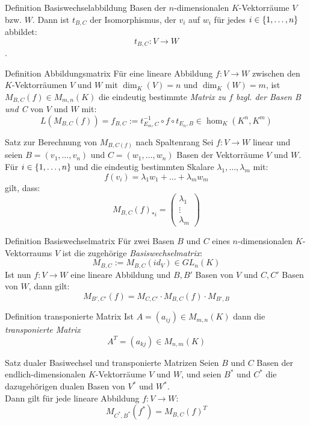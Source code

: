 \documentclass[main.tex]{subfiles}
\begin{document}
\begin{karte}{Definition Basiswechselabbildung}
    Basen der \(n\)-dimensionalen \(K\)-Vektorräume \(V\) bzw. \(W\).
    Dann ist \(t_{B,C}\) der Isomorphismus, der \(v_i\) auf \(w_i\) für 
    jedes \(i \in \{1, \ldots ,n\}\) abbildet: 
    \[ t_{B,C}: V \rightarrow W \].
\end{karte}
\begin{karte}{Definition Abbildungsmatrix}
    Für eine lineare Abbildung \(f:V \rightarrow W\) zwischen den
    \(K\)-Vektorräumen \(V\) und \(W\) mit \(\dim_K(V) = n\) und 
    \(\dim_K(W) = m\), ist \(M_{B,C}(f) \in M_{m,n}(K)\) die 
    eindeutig bestimmte \textit{Matrix zu \(f\) bzgl. der Basen 
    B und C} von \(V\) und \(W\) mit: 
    \[ L(M_{B,C}(f)) = f_{B,C} := t_{E_m,C}^{-1} \circ f \circ t_{E_n,B} 
    \in \hom_K(K^n,K^m)\] 
\end{karte}
\begin{karte}{Satz zur Berechnung von \(M_{B,C(f)}\) nach Spaltenrang}
    Sei \(f: V \rightarrow W\) linear und seien \(B = (v_1, \ldots ,v_n)\)
    und \(C = (w_1, \ldots , w_n)\) Basen der Vektorräume \(V\) und \(W\).
    Für \(i \in \{1,\ldots,n\}\) und die eindeutig bestimmten Skalare
    \(\lambda_1,\ldots,\lambda_m\) mit:
    \[f(v_i) = \lambda_1w_1 + \ldots + \lambda_mw_m\]
    gilt, dass: 
    \[M_{B,C}(f)_{*i} = 
    \begin{pmatrix}
        \lambda_1 \\
        \vdots\\
        \lambda_m
    \end{pmatrix}\]
\end{karte}
\begin{karte}{Definition Basiswechselmatrix}
    Für zwei Basen \(B\) und \(C\) eines \(n\)-dimensionalen 
    \(K\)-Vektorraums \(V\) ist die zugehörige 
    \textit{Basiswechselmatrix}:
    \[M_{B,C} := M_{B,C}(id_V) \in GL_n(K) \]
    Ist nun \(f: V \rightarrow W\) eine lineare Abbildung und 
    \(B,B'\) Basen von \(V\) und \(C,C'\) Basen von \(W\), dann gilt:
    \[ M_{B',C'}(f) = M_{C,C'} \cdot M_{B,C}(f) \cdot M_{B',B} \]
\end{karte}
\begin{karte}{Definition transponierte Matrix}
    Ist \(A = (a_{ij}) \in M_{m,n}(K)\) dann die \textit{transponierte Matrix}
    \[ A^T  = (a_{kj}) \in M_{n,m}(K) \]
\end{karte}
\begin{karte}{Satz dualer Basiwechsel und transponierte Matrizen}
    Seien \(B\) und \(C\) Basen der endlich-dimensionalen 
    \(K\)-Vektorräume \(V\) und \(W\), und seien \(B^*\) und \(C^*\)
    die dazugehörigen dualen Basen von \(V^*\) und \(W^*\).\\
    Dann gilt für jede lineare Abbildung \(f: V \rightarrow W\):
    \[M_{C^*,B^*}(f^*) = M_{B,C}(f)^T\]   

\end{karte}
\end{document}
